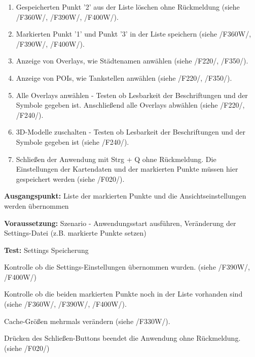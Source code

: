 \documentclass[10pt]{scrreprt}
\newcommand{\sfbf}[1]{\textbf{\sffamily #1}}
\newcommand{\ziel}[1]{{\fontsize{9.5}{11}\textsf{/#1/}}}
\newcommand{\ziellabel}{Z}
\newcommand{\muss}{\renewcommand{\labelenumi}{\textbf{\ziel{\ziellabel\numprint{\theenumi}0}}}}
\newcommand{\wunsch}{\renewcommand{\labelenumi}{\textbf{\ziel{\ziellabel\numprint{\theenumi}0W}}}}
\newenvironment{details}[1][6pt]{%
  \parskip#1 \parindent6mm \raggedright%
  \def\item{\par\ignorespaces\hangindent=5mm \hangafter1}}{%
  \par\ignorespaces}
\begin{document}
\begin{enumerate}[leftmargin = 2.2cm, resume]
\item Gespeicherten Punkt '2' aus der Liste löschen ohne Rückmeldung (siehe \ziel{F360W}, \ziel{F390W}, \ziel{F400W}).
\item Markierten Punkt '1' und Punkt '3' in der Liste speichern (siehe \ziel{F360W}, \ziel{F390W}, \ziel{F400W}).
\muss
\item Anzeige von Overlays, wie Städtenamen anwählen (siehe \ziel{F220}, \ziel{F350}).
\item Anzeige von POIs, wie Tankstellen anwählen (siehe \ziel{F220}, \ziel{F350}).
\item Alle Overlays anwählen - Testen ob Lesbarkeit der Beschriftungen und der Symbole gegeben ist. Anschließend alle Overlays abwählen (siehe \ziel{F220}, \ziel{F240}).
\item 3D-Modelle zuschalten - Testen ob Lesbarkeit der Beschriftungen und der Symbole gegeben ist (siehe \ziel{F240}).
\item  Schließen der Anwendung mit Strg + Q ohne Rückmeldung. Die Einstellungen der Kartendaten und der markierten Punkte müssen hier gespeichert werden (siehe \ziel{F020}).
\end{enumerate}

\vspace{1.0cm}
\begin{details}[2pt]
\item \sfbf{Ausgangspunkt:} Liste der markierten Punkte und die Ansichtseinstellungen werden übernommen
\item \sfbf{Voraussetzung:} Szenario - Anwendungsstart ausführen, Veränderung der Settings-Datei (z.B. markierte Punkte setzen)
\item \sfbf{Test:} Settings Speicherung
\end{details}
\vspace{2mm}
\begin{enumerate}[leftmargin = 2.2cm, resume]
\wunsch
\item Kontrolle ob die Settings-Einstellungen übernommen wurden. (siehe \ziel{F390W}, \ziel{F400W})
\item Kontrolle ob die beiden markierten Punkte noch in der Liste vorhanden sind (siehe \ziel{F360W}, \ziel{F390W}, \ziel{F400W}).
\item Cache-Größen mehrmals verändern (siehe \ziel{F330W}).
\muss
\item Drücken des Schließen-Buttons beendet die Anwendung ohne Rückmeldung. (siehe \ziel{F020})
\end{enumerate}
\end{document}
